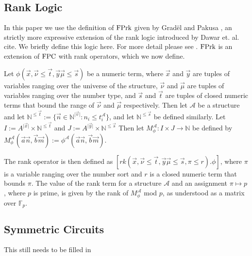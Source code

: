 \documentclass[../paper.tex]{subfiles}
\begin{document}
\subsection{Rank Logic}
In this paper we use the definition of $\text{\upshape FPrk}$ given by Grad\"{e}l and Pakusa
\cite{}, an strictly more expressive extension of the rank logic introduced by
Dawar et. al. cite{}. We briefly define this logic here. For more detail please
see \cite{}. $\text{\upshape FPrk}$ is an extension of $\text{\upshape FPC}$ with rank operators, which we now
define.

Let $\phi (\vec{x}, \vec {\nu} \leq \vec{t}, \vec{y}\vec{\mu} \leq \vec{s})$ be
a numeric term, where $\vec{x}$ and $\vec{y}$ are tuples of variables ranging
over the universe of the structure, $\vec{\nu}$ and $\vec{\mu}$ are tuples of
variables ranging over the number type, and $\vec{s}$ and $\vec{t}$ are tuples
of closed numeric terms that bound the range of $\vec{\nu}$ and $\vec{\mu}$
respectively. Then let $\mathcal{A}$ be a structure and let
$\mathbb{N}^{\leq\vec{t}} := \{\vec{n} \in \mathbb{N}^{\vert \vec{v} \vert}: n_i
\leq t^{\mathcal{A}}_i\}$, and let $\mathbb{N}^{\leq \vec{s}}$ be defined
similarly. Let $I:= A^{\vert \vec{x} \vert} \times \mathbb{N}^{\leq \vec{t}}$
and $J := A^{\vert \vec{y} \vert} \times \mathbb{N}^{\leq \vec{s}}$ Then let
$M^{\mathcal{A}}_\phi : I \times J \rightarrow \mathbb{N}$ be defined by
$M^{\mathcal{A}}_\phi (\vec{a}\vec{n}, \vec{b}\vec{m}):=
\phi^{\mathcal{A}}(\vec{a}\vec{n},\vec{b}\vec{m})$.

The rank operator is then defined as $[rk (\vec{x}, \vec {\nu} \leq \vec{t},
\vec{y}\vec{\mu} \leq \vec{s}, \pi \leq r). \phi]$, where $\pi$ is a variable
ranging over the number sort and $r$ is a closed numeric term that bounds $\pi$.
The value of the rank term for a structure $\mathcal{A}$ and an assignment $\pi
\mapsto p$, where $p$ is prime, is given by the rank of $M^{\mathcal{A}}_\phi$
mod $p$, as understood as a matrix over $\mathbb{F}_p$.

\subsection{Symmetric Circuits}
This still needs to be filled in
\end{document}
